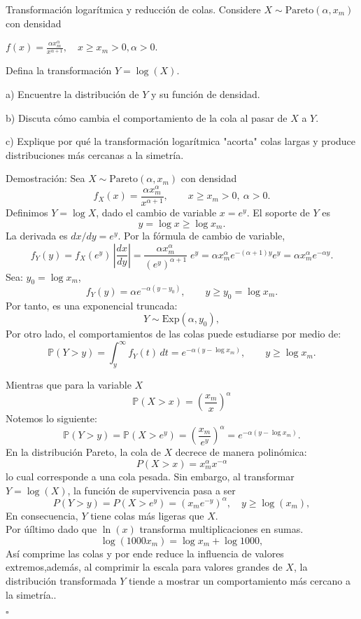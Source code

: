 \documentclass[a4paper,11pt]{article}
\begin{document}
\begin{ejercicio}{9}
Transformación logarítmica y reducción de colas. Considere $X \sim \text{Pareto}(\alpha, x_m)$
con densidad

$f(x) = \frac{\alpha x_m^\alpha}{x^{\alpha+1}}, \quad x \geq x_m > 0, \alpha > 0$.

Defina la transformación $Y = \log(X)$.

a) Encuentre la distribución de $Y$ y su función de densidad.

b) Discuta cómo cambia el comportamiento de la cola al pasar de $X$ a $Y$.

c) Explique por qué la transformación logarítmica "acorta" colas largas y produce distribuciones más cercanas a la simetría.
\end{ejercicio}\begin{demostracion}{Demostración:}
Sea \(X\sim\mathrm{Pareto}(\alpha,x_m)\) con densidad
\[
f_X(x)=\frac{\alpha x_m^\alpha}{x^{\alpha+1}},\qquad x\ge x_m>0,\ \alpha>0.
\]
Definimos \(Y=\log X\), dado el  cambio de variable \(x=e^y\). El soporte de \(Y\) es
\[
y=\log x\ge \log x_m.
\]
La derivada es \(dx/dy=e^y\). Por la fórmula de cambio de variable,
\[
f_Y(y)=f_X(e^y)\,\left|\frac{dx}{dy}\right|
= \frac{\alpha x_m^\alpha}{(e^y)^{\alpha+1}} \; e^y
= \alpha x_m^\alpha e^{-(\alpha+1)y} e^{y}
= \alpha x_m^\alpha e^{-\alpha y}.
\]
Sea: \(y_0=\log x_m\),
\[
f_Y(y)=\alpha e^{-\alpha (y-y_0)},\qquad y\ge y_0=\log x_m.
\]
Por tanto, es una exponencial truncada:
\[
Y\sim \mathrm{Exp}(\alpha,y_0),
\]
Por otro lado, el comportamientos de las colas puede estudiarse por medio de:
\[
\mathbb{P}(Y>y)=\int_y^\infty f_Y(t)\,dt = e^{-\alpha(y-\log x_m)},\qquad y\ge\log x_m.
\]

Mientras que para la variable $X$ 
\[
\mathbb{P}(X>x)=\left(\frac{x_m}{x}\right)^{\alpha}
\]
Notemos lo siguiente:
\[
\mathbb{P}(Y>y)=\mathbb{P}(X>e^y)=\left(\frac{x_m}{e^y}\right)^{\alpha}=e^{-\alpha(y-\log x_m)}.
\]
    En la distribución Pareto, la cola de $X$ decrece de manera polinómica:
    \[
    P(X > x) = x_m^{\alpha} x^{-\alpha}
    \]
    lo cual corresponde a una cola pesada.  
    Sin embargo, al transformar $Y = \log(X)$, la función de supervivencia pasa a ser
    \[
    P(Y > y) = P(X > e^y) = (x_m e^{-y})^{\alpha}, \quad y \geq \log(x_m),
    \]
    En consecuencia, $Y$ tiene colas  más ligeras que $X$. \\
 Por úíltimo dado que  $\ln(x)$ transforma multiplicaciones en sumas. 
  \[
  \log(1000 x_m)=\log x_m + \log 1000,
\]
Así comprime las colas y por ende reduce la influencia de valores extremos,además, al comprimir la escala para valores grandes de $X$, la distribución transformada $Y$ tiende a mostrar un comportamiento más cercano a la simetría..

\noindent\(\square\)
\end{demostracion}
\end{document}

